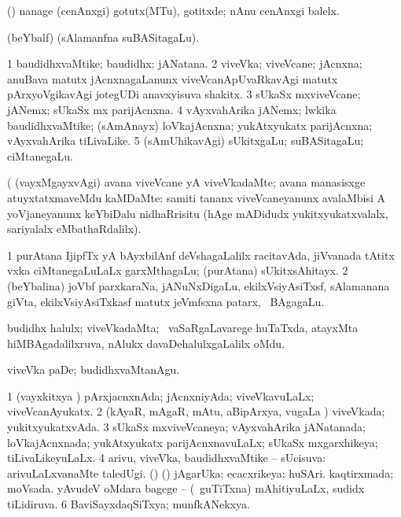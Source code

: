 \bentry
{}
\gl{\akirx}
\bmng
(\pArxparx) nanage (cenAnxgi) gotutx(MTu), gotitxde; nAnu cenAnxgi balelx. 
\emng
\eentry

\bentry
{}
\gl{\saMkiSx}
\bmng
{} 
\emng
\eentry

\bentry
{}
\gl{\saMkiSx}
\bmng
{} (beYbalf) (sAlamanfna suBASitagaLu). 
\emng
\eentry

\bentry
{}
\gl{\nA}
\bmng
\bnum
\num{1} baudidhxvaMtike; baudidhx; jANatana. 
\num{2} viveVka; viveVcane; jAcnxna; anuBava matutx jAcnxnagaLanunx viveVcanApUvaRkavAgi matutx pArxyoVgikavAgi jotegUDi anavxyisuva shakitx. 
\num{3} sUkaSx mxviveVcane; jANemx; sUkaSx mx parijAcnxna. 
\num{4} vAyxvahArika jANemx; lwkika baudidhxvaMtike; (sAmAnayx) loVkajAcnxna; yukAtxyukatx parijAcnxna; vAyxvahArika tiLivaLike. 
\num{5} (sAmUhikavAgi) sUkitxgaLu; suBASitagaLu; ciMtanegaLu. 
\enum
\emng

\noindent 
\gl{\pagu}
\bmng
{} (  (vayxMgayxvAgi) avana viveVcane yA viveVkadaMte; avana manasisxge atuyxtatxmaveMdu kaMDaMte:  samiti tananx viveVcaneyanunx avalaMbisi A yoVjaneyanunx keYbiDalu nidhaRrisitu (hAge mADidudx yukitxyukatxvalalx, sariyalalx eMbathaRdalilx). 
\emng
\eentry

\bentry
{}
\gl{\nA}
\bmng
\bnum
\num{1} purAtana IjipfTx yA bAyxbilAnf deVshagaLalilx racitavAda, jiVvanada tAtitx vxka ciMtanegaLuLaLx garxMthagaLu; (purAtana) sUkitxsAhitayx. 
\num{2} (beYbalina) joVbf parxkaraNa, jANuNxDigaLu, ekilxVsiyAsiTxsf, sAlamanana giVta, ekilxVsiyAsiTxkasf matutx jeVmfsxna patarx, \mo\ BAgagaLu. 
\enum
\emng
\eentry

\bentry
{} 
\gl{\nA}
\expl{}
\bmng
budidhx halulx; viveVkadaMta; \sA\ vaSaRgaLavarege huTaTxda, atayxMta hiMBAgadalilxruva, nAlukx davaDehalulxgaLalilx oMdu. 
\emng

\noindent
\gl{\pagu}
\bmng
{} viveVka paDe; budidhxvaMtanAgu. 
\emng
\eentry

\bentry
{} 
\gl{\gu}
\expl{}
\bmng
\bnum
\num{1} (vayxkitxya \vi) pArxjacnxnAda; jAcnxniyAda; viveVkavuLaLx; viveVcanAyukatx. 
\num{2} (kAyaR, mAgaR, mAtu, aBipArxya, \mo vugaLa \vi) viveVkada; yukitxyukatxvAda. 
\num{3} sUkaSx mxviveVcaneya; vAyxvahArika jANatanada; loVkajAcnxnada; yukAtxyukatx parijAcnxnavuLaLx; sUkaSx mxgarxhikeya; tiLivaLikeyuLaLx. 
\num{4} arivu, viveVka, baudidhxvaMtike -- sUcisuva:  arivuLaLxvanaMte taledUgi. 
 (\ame) (\AmA) 
\banum
{} jAgarUka; ecacxrikeya; huSAri. 
 kaqtirxmada; moVsada. 
 yAvudeV oMdara bagege -- (\sA\ guTiTxna) mAhitiyuLaLx, sudidx tiLidiruva. 
\eanum
\numie
\num{6} BaviSayxdaqSiTxya; munfkANekxya. 
\enum
\emng

